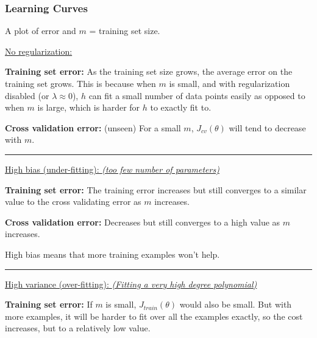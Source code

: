 \documentclass{article}
\begin{document}
\newpage

\subsubsection{Learning Curves}

A plot of error and $m$ = training set size.

\begin{center}
\underline{{No regularization:}}
\end{center}


\textbf{Training set error:} As the training set size grows, the average error on the training set grows. This is because when $m$ is small, and with regularization disabled (or $\lambda \approx 0$), $h$ can fit a small number of data points easily as opposed to when $m$ is large, which is harder for $h$ to exactly fit to.


\textbf{Cross validation error:} (unseen) For a small $m$, $J_{cv} (\theta)$ will tend to decrease with $m$.


\par\noindent\rule{\textwidth}{0.2pt}

\begin{center}
\underline{{High bias (under-fitting):\textit{ (too few number of parameters)}} }
\end{center}

\textbf{Training set error:} The training error increases but still converges to a similar value to the cross validating error as $m$ increases.

\textbf{Cross validation error:} Decreases but still converges to a high value as $m$ increases.

\begin{myboxr}
High bias means that more training examples won't help.
\end{myboxr}



\par\noindent\rule{\textwidth}{0.2pt}



\begin{center}
\underline{{High variance (over-fitting):} \textit{(Fitting a very high degree polynomial)}}
\end{center}

\textbf{Training set error:} If $m$ is small, $J_{train}(\theta)$ would also be small. But with more examples, it will be harder to fit over all the examples exactly, so the cost increases, but to a relatively low value.
\end{document}

